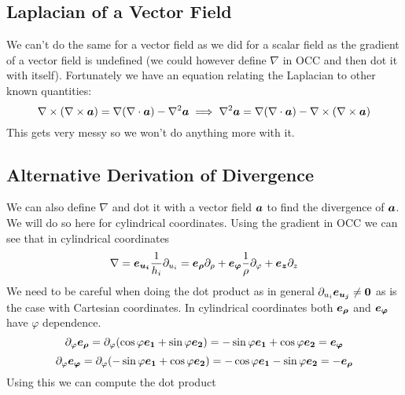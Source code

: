 \documentclass{article}
\begin{document}
    \subsection{Laplacian of a Vector Field}
    We can't do the same for a vector field as we did for a scalar field as the gradient of a vector field is undefined (we could however define \(\nabla\) in OCC and then dot it with itself).
    Fortunately we have an equation relating the Laplacian to other known quantities:
    \[\curl(\curl\vv a) = \grad(\div\vv a) - \laplacian\vv a \implies \laplacian\vv a = \grad(\div\vv a) - \curl(\curl\vv a)\]
    This gets very messy so we won't do anything more with it.
    
    \subsection{Alternative Derivation of Divergence}
    We can also define \(\nabla\) and dot it with a vector field \(\bm{a}\) to find the divergence of \(\bm{a}\).
    We will do so here for cylindrical coordinates.
    Using the gradient in OCC we can see that in cylindrical coordinates
    \[\nabla = \bm{e_{u_i}}\frac{1}{h_i}\partial_{u_i} = \bm{e_{\rho}}\partial_\rho + \bm{e_{\varphi}}\frac{1}{\rho}\partial_\varphi + \bm{e_{z}}\partial_z\]
    We need to be careful when doing the dot product as in general \(\partial_{u_i}\bm{e_{u_j}}\ne\bm{0}\) as is the case with Cartesian coordinates.
    In cylindrical coordinates both \(\bm{e_{\rho}}\) and \(\bm{e_{\varphi}}\) have \(\varphi\) dependence.
    \[\partial_\varphi\bm{e_{\rho}} = \partial_\varphi(\cos\varphi\bm{e_{1}} + \sin\varphi\bm{e_{2}}) = -\sin\varphi\bm{e_{1}} + \cos\varphi\bm{e_{2}} = \bm{e_{\varphi}}\]
    \[\partial_\varphi\bm{e_{\varphi}} = \partial_\varphi(-\sin\varphi\bm{e_{1}} + \cos\varphi\bm{e_{2}}) = -\cos\varphi\bm{e_{1}} - \sin\varphi\bm{e_{2}} = - \bm{e_{\rho}}\]
    Using this we can compute the dot product
\end{document}
